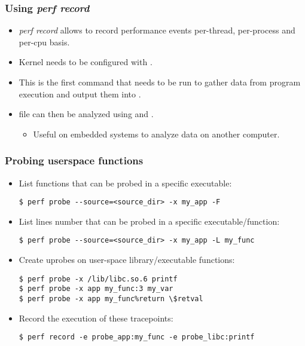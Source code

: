 \begin{frame}[fragile]
  \frametitle{Using {\em perf record}}
  \begin{itemize}
    \item {\em perf record} allows to record performance events per-thread,
          per-process and per-cpu basis.
    \item Kernel needs to be configured with .
    \item This is the first command that needs to be run to gather data from
          program execution and output them into .
    \item {} file can then be analyzed using 
          and .
    \begin{itemize}
      \item Useful on embedded systems to analyze data on another computer.
    \end{itemize}
  \end{itemize}
\end{frame}

\begin{frame}[fragile]
  \frametitle{Probing userspace functions}
  \begin{itemize}
    \item List functions that can be probed in a specific
          executable:
  \begin{block}{}
    \begin{verbatim}
$ perf probe --source=<source_dir> -x my_app -F
    \end{verbatim}
  \end{block}
    \item List lines number that can be probed in a specific
          executable/function:
  \begin{block}{}
    \begin{verbatim}
$ perf probe --source=<source_dir> -x my_app -L my_func
    \end{verbatim}
  \end{block}
    \item Create uprobes on user-space library/executable functions:
  \begin{block}{}
    \begin{verbatim}
$ perf probe -x /lib/libc.so.6 printf
$ perf probe -x app my_func:3 my_var
$ perf probe -x app my_func%return \$retval
    \end{verbatim}
  \end{block}
  \item Record the execution of these tracepoints:
  \begin{block}{}
    \begin{verbatim}
$ perf record -e probe_app:my_func -e probe_libc:printf
    \end{verbatim}
  \end{block}
  \end{itemize}
\end{frame}

